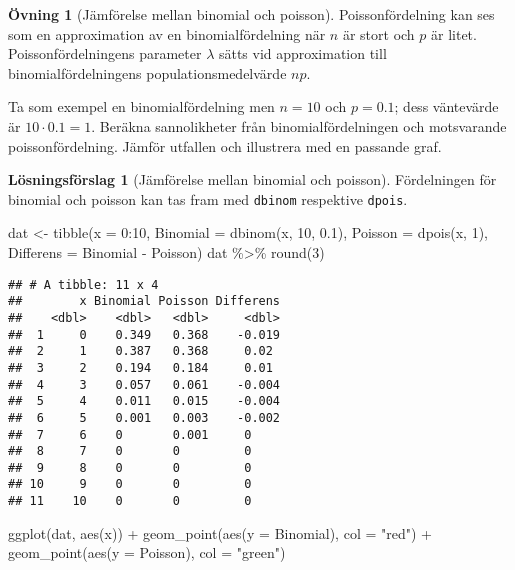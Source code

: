 \documentclass[
]{book}
\newenvironment{Shaded}{\begin{snugshade}}{\end{snugshade}}
\newcommand{\AttributeTok}[1]{\textcolor[rgb]{0.77,0.63,0.00}{#1}}
\newcommand{\DecValTok}[1]{\textcolor[rgb]{0.00,0.00,0.81}{#1}}
\newcommand{\FloatTok}[1]{\textcolor[rgb]{0.00,0.00,0.81}{#1}}
\newcommand{\FunctionTok}[1]{\textcolor[rgb]{0.00,0.00,0.00}{#1}}
\newcommand{\NormalTok}[1]{#1}
\newcommand{\OtherTok}[1]{\textcolor[rgb]{0.56,0.35,0.01}{#1}}
\newcommand{\SpecialCharTok}[1]{\textcolor[rgb]{0.00,0.00,0.00}{#1}}
\newcommand{\StringTok}[1]{\textcolor[rgb]{0.31,0.60,0.02}{#1}}
\theoremstyle{definition}
\theoremstyle{definition}
\theoremstyle{definition}
\newtheorem{exercise}{Övning}[chapter]
\theoremstyle{definition}
\newtheorem{hypothesis}{Lösningsförslag}[chapter]
\theoremstyle{remark}
\begin{document}
\begin{exercise}[Jämförelse mellan binomial och poisson]
Poissonfördelning kan ses som en approximation av en binomialfördelning när \(n\) är stort och \(p\) är litet. Poissonfördelningens parameter \(\lambda\) sätts vid approximation till binomialfördelningens populationsmedelvärde \(np\).

Ta som exempel en binomialfördelning men \(n = 10\) och \(p = 0.1\); dess väntevärde är \(10 \cdot 0.1 = 1\).
Beräkna sannolikheter från binomialfördelningen och motsvarande poissonfördelning. Jämför utfallen och illustrera med en passande graf.
\end{exercise}

\begin{hypothesis}[Jämförelse mellan binomial och poisson]
Fördelningen för binomial och poisson kan tas fram med \texttt{dbinom} respektive \texttt{dpois}.

\begin{Shaded}
\begin{Highlighting}[]
\NormalTok{dat }\OtherTok{\textless{}{-}} \FunctionTok{tibble}\NormalTok{(}\AttributeTok{x =} \DecValTok{0}\SpecialCharTok{:}\DecValTok{10}\NormalTok{,}
              \AttributeTok{Binomial =} \FunctionTok{dbinom}\NormalTok{(x, }\DecValTok{10}\NormalTok{, }\FloatTok{0.1}\NormalTok{),}
              \AttributeTok{Poisson =} \FunctionTok{dpois}\NormalTok{(x, }\DecValTok{1}\NormalTok{),}
              \AttributeTok{Differens =}\NormalTok{ Binomial }\SpecialCharTok{{-}}\NormalTok{ Poisson)}
\NormalTok{dat }\SpecialCharTok{\%\textgreater{}\%} \FunctionTok{round}\NormalTok{(}\DecValTok{3}\NormalTok{)}
\end{Highlighting}
\end{Shaded}

\begin{verbatim}
## # A tibble: 11 x 4
##        x Binomial Poisson Differens
##    <dbl>    <dbl>   <dbl>     <dbl>
##  1     0    0.349   0.368    -0.019
##  2     1    0.387   0.368     0.02 
##  3     2    0.194   0.184     0.01 
##  4     3    0.057   0.061    -0.004
##  5     4    0.011   0.015    -0.004
##  6     5    0.001   0.003    -0.002
##  7     6    0       0.001     0    
##  8     7    0       0         0    
##  9     8    0       0         0    
## 10     9    0       0         0    
## 11    10    0       0         0
\end{verbatim}

\begin{Shaded}
\begin{Highlighting}[]
\FunctionTok{ggplot}\NormalTok{(dat, }\FunctionTok{aes}\NormalTok{(x)) }\SpecialCharTok{+}
  \FunctionTok{geom\_point}\NormalTok{(}\FunctionTok{aes}\NormalTok{(}\AttributeTok{y =}\NormalTok{ Binomial), }\AttributeTok{col =} \StringTok{"red"}\NormalTok{) }\SpecialCharTok{+}
  \FunctionTok{geom\_point}\NormalTok{(}\FunctionTok{aes}\NormalTok{(}\AttributeTok{y =}\NormalTok{ Poisson), }\AttributeTok{col =} \StringTok{"green"}\NormalTok{)}
\end{Highlighting}
\end{Shaded}


\end{hypothesis}
\end{document}
